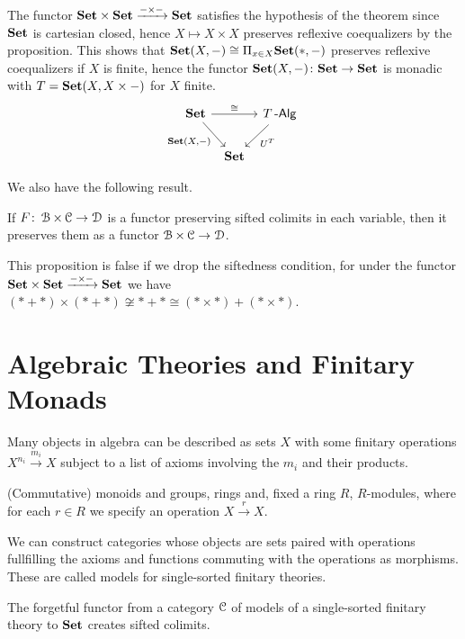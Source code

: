 \documentclass[a4paper,11pt,oneside,openany]{scrbook}
\begin{document}
\begin{exmp}
	The functor ${\normalfont\textbf{Set}}\times{\normalfont\textbf{Set}}\xrightarrow{-\times-}{\normalfont\textbf{Set}}$ satisfies the hypothesis of the theorem since ${\normalfont\textbf{Set}}$ is cartesian closed, hence $X\mapsto X\times X$ preserves reflexive coequalizers by the proposition. This shows that ${\normalfont\textbf{Set}}(X,-)\cong\Pi_{x\in X}{\normalfont\textbf{Set}}(*,-)$ preserves reflexive coequalizers if $X$ is finite, hence the functor ${\normalfont\textbf{Set}}(X,-)\colon{\normalfont\textbf{Set}}\rightarrow{\normalfont\textbf{Set}}$ is monadic with $T={\normalfont\textbf{Set}}(X,X\times-)$ for $X$ finite.
	\[
	\begin{tikzcd}[column sep=tiny]
	\Set\ar[rr, "\cong"] \ar[dr, swap, "{\Set(X,-)}"]
	&& T\Alg\ar[dl, "U^T"] \\
	& \Set
	\end{tikzcd}
	\]
\end{exmp}

We also have the following result.

\begin{prop}
	If $F\colon\operatorname{\mathcal{B}}\times\operatorname{\mathcal{C}}\rightarrow\operatorname{\mathcal{D}}$ is a functor preserving sifted colimits in each variable, then it preserves them as a functor $\operatorname{\mathcal{B}}\times\operatorname{\mathcal{C}}\rightarrow\operatorname{\mathcal{D}}$.
\end{prop}

\begin{rmk}
	This proposition is false if we drop the siftedness condition, for under the functor ${\normalfont\textbf{Set}}\times{\normalfont\textbf{Set}}\xrightarrow{-\times-}{\normalfont\textbf{Set}}$ we have $(*+*)\times (*+*)\not\cong *+*\cong (*\times*)+(*\times *)$.
\end{rmk}

\section{Algebraic Theories and Finitary Monads}

Many objects in algebra can be described as sets $X$ with some finitary operations $X^{n_i}\xrightarrow{m_i}X$ subject to a list of axioms involving the $m_i$ and their products.

\begin{exmp}
	(Commutative) monoids and groups, rings and, fixed a ring $R$, $R$-modules, where for each $r\in R$ we specify an operation $X\xrightarrow{r}X$.
\end{exmp}

We can construct categories whose objects are sets paired with operations fullfilling the axioms and functions commuting with the operations as morphisms. These are called models for single-sorted finitary theories.

\begin{prop}
	The forgetful functor from a category $\operatorname{\mathcal{C}}$ of models of a single-sorted finitary theory to ${\normalfont\textbf{Set}}$ creates sifted colimits.
\end{prop}
\end{document}
